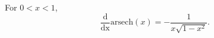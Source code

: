 For $0 < x < 1 $,
  \[ \frac{\mathrm{d}}{\mathrm{dx}} \mathrm{arsech}(x) 
= - \frac{1}{x \sqrt{1 - x^2}} . \]